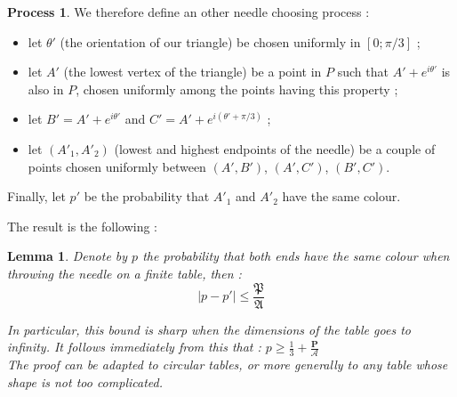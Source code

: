 \documentclass[a4paper,11pt]{article}
\newtheorem{lemma}{Lemma}
\theoremstyle{definition}
\newtheorem{process}{Process}
\theoremstyle{remark}
\begin{document}
\begin{process}
We therefore define an other needle choosing process :
\begin{itemize}
  \item let $\theta '$ (the orientation of our triangle) be chosen uniformly in $[0;\pi / 3]$ ;
  \item let $A'$ (the lowest vertex of the triangle) be a point in $P$ such that $A' + e^{i\theta '}$ is also in $P$, chosen uniformly among the points having this property ;
  \item let $B' = A' + e^{i \theta '}$ and $C' = A' + e^{i (\theta ' + \pi / 3 ) }$ ;
  \item let $(A'_1,A'_2)$ (lowest and highest endpoints of the needle) be a couple of points chosen uniformly between $(A',B')$, $(A',C')$, $(B',C')$.
\end{itemize}
Finally, let $p'$ be the probability that $A'_1$ and $A'_2$ have the same colour.
\end{process}


The result is the following :
\begin{lemma}
Denote by $p$ the probability that both ends have the same colour when throwing the needle on a finite table, then :
 $$ | p - p'| \leq \frac{\mathfrak{P}}{\mathfrak{A}} $$

In particular, this bound is sharp when the dimensions of the table goes to infinity. It follows immediately from this that : $p \geq \frac13 + \frac{\mathbf{P}}{\mathcal{A}}$ \\
The proof can be adapted to circular tables, or more generally to any table whose shape is not too complicated. \\
\end{lemma}
\end{document}
